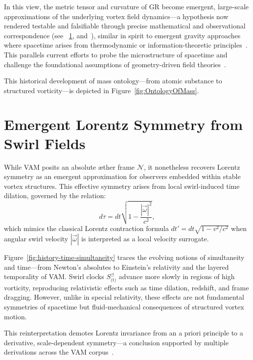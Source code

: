 In this view, the metric tensor and curvature of GR become emergent, large-scale approximations of the underlying vortex field dynamics—a hypothesis now rendered testable and falsifiable through precise mathematical and observational correspondence (see ~\ref{sec:lorentz_recovery}, and~\cite{VAM-8, VAM-3}), similar in spirit to emergent gravity approaches where spacetime arises from thermodynamic or information-theoretic principles~\cite{Verlinde2011}. This parallels current efforts to probe the microstructure of spacetime and challenge the foundational assumptions of geometry-driven field theories~\cite{hossenfelder2018lost}.

This historical development of mass ontology—from atomic substance to structured vorticity—is depicted in Figure~\ref{fig:OntologyOfMass}.




\section{Emergent Lorentz Symmetry from Swirl Fields}
\label{sec:lorentz_recovery}

While VAM posits an absolute æther frame \(\boldsymbol{\mathcal{N}}\), it nonetheless recovers Lorentz symmetry as an emergent approximation for observers embedded within stable vortex structures. This effective symmetry arises from local swirl-induced time dilation, governed by the relation:
\begin{equation}
    d\tau = dt \sqrt{1 - \frac{|\vec{\omega}|^2}{c^2}},
\end{equation}
which mimics the classical Lorentz contraction formula \(dt' = dt \sqrt{1 - v^2/c^2}\) when angular swirl velocity \(|\vec{\omega}|\) is interpreted as a local velocity surrogate.

Figure~\ref{fig:history-time-simultaneity} traces the evolving notions of simultaneity and time—from Newton’s absolutes to Einstein’s relativity and the layered temporality of VAM.
Swirl clocks \(S^{\circlearrowleft}_\text{(t)}\) advance more slowly in regions of high vorticity, reproducing relativistic effects such as time dilation, redshift, and frame dragging. However, unlike in special relativity, these effects are not fundamental symmetries of spacetime but fluid-mechanical consequences of structured vortex motion.

This reinterpretation demotes Lorentz invariance from an a priori principle to a derivative, scale-dependent symmetry—a conclusion supported by multiple derivations across the VAM corpus~\cite{VAM-1, VAM-2, VAM-15}.

